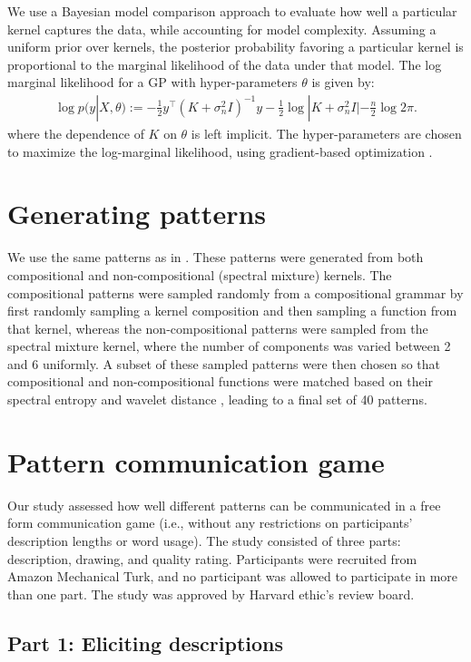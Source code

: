 \documentclass[a4paper,man, floatsintext, natbib]{apa6}
\begin{document}
We use a Bayesian model comparison approach to evaluate how well a particular kernel captures the data, while accounting for model complexity. Assuming a uniform prior over kernels, the posterior probability favoring a particular kernel is proportional to the marginal likelihood of the data under that model. The log marginal likelihood for a GP with hyper-parameters $\theta$ is given by:
\begin{align}
\log p(y|X,\theta) :=-\frac{1}{2}y^\top (K+\sigma_n^2I)^{-1}y-\frac{1}{2}\log |K+\sigma_n^2I|-\frac{n}{2}\log 2\pi.
\end{align}
where the dependence of $K$ on $\theta$ is left implicit. The hyper-parameters are chosen to maximize the log-marginal likelihood, using gradient-based optimization \citep{rasmussen2010gaussian}.

\section{Generating patterns}

We use the same patterns as in \cite{schulz2017compositional}. These patterns were generated from both compositional and non-compositional (spectral mixture) kernels. The compositional patterns were sampled randomly from a compositional grammar by first randomly sampling a kernel composition and then sampling a function from that kernel, whereas the non-compositional patterns were sampled from the spectral mixture kernel, where the number of components was varied between 2 and 6 uniformly. A subset of these sampled patterns were then chosen so that compositional and non-compositional functions were matched based on their spectral entropy and wavelet distance \citep{goerg2013forecastable}, leading to a final set of 40 patterns.

\section{Pattern communication game}

Our study assessed how well different patterns can be communicated in a free form communication game (i.e., without any restrictions on participants' description lengths or word usage). The study consisted of three parts: description, drawing, and quality rating. Participants were recruited from Amazon Mechanical Turk, and no participant was allowed to participate in more than one part. The study was approved by Harvard ethic's review board.

\subsection{Part 1: Eliciting descriptions}
\end{document}
